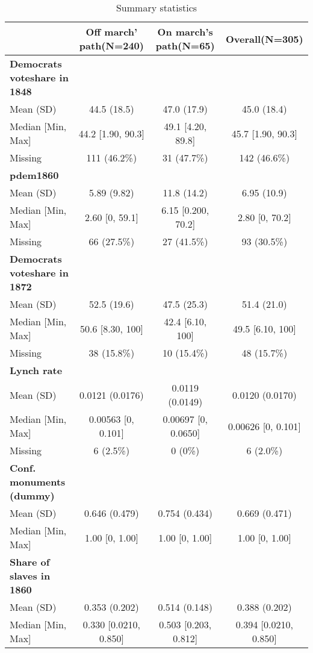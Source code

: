 \begin{table}[h]

\caption{\label{tab:desc_stat}Summary statistics}
\centering
\fontsize{8}{10}\selectfont
\begin{tabular}[t]{>{}lccc}
\toprule
 & Off march' path(N=240) & On march's path(N=65) & Overall(N=305)\\
\midrule
\textbf{Democrats voteshare in 1848} &  &  & \\
Mean (SD) & 44.5 (18.5) & 47.0 (17.9) & 45.0 (18.4)\\
Median [Min, Max] & 44.2 [1.90, 90.3] & 49.1 [4.20, 89.8] & 45.7 [1.90, 90.3]\\
Missing & 111 (46.2\%) & 31 (47.7\%) & 142 (46.6\%)\\
\addlinespace
\textbf{pdem1860} &  &  & \\
Mean (SD) & 5.89 (9.82) & 11.8 (14.2) & 6.95 (10.9)\\
Median [Min, Max] & 2.60 [0, 59.1] & 6.15 [0.200, 70.2] & 2.80 [0, 70.2]\\
Missing & 66 (27.5\%) & 27 (41.5\%) & 93 (30.5\%)\\
\addlinespace
\textbf{Democrats voteshare in 1872} &  &  & \\
Mean (SD) & 52.5 (19.6) & 47.5 (25.3) & 51.4 (21.0)\\
Median [Min, Max] & 50.6 [8.30, 100] & 42.4 [6.10, 100] & 49.5 [6.10, 100]\\
Missing & 38 (15.8\%) & 10 (15.4\%) & 48 (15.7\%)\\
\addlinespace
\textbf{Lynch rate} &  &  & \\
Mean (SD) & 0.0121 (0.0176) & 0.0119 (0.0149) & 0.0120 (0.0170)\\
Median [Min, Max] & 0.00563 [0, 0.101] & 0.00697 [0, 0.0650] & 0.00626 [0, 0.101]\\
Missing & 6 (2.5\%) & 0 (0\%) & 6 (2.0\%)\\
\addlinespace
\textbf{Conf. monuments (dummy)} &  &  & \\
Mean (SD) & 0.646 (0.479) & 0.754 (0.434) & 0.669 (0.471)\\
Median [Min, Max] & 1.00 [0, 1.00] & 1.00 [0, 1.00] & 1.00 [0, 1.00]\\
\addlinespace
\textbf{Share of slaves in 1860} &  &  & \\
Mean (SD) & 0.353 (0.202) & 0.514 (0.148) & 0.388 (0.202)\\
Median [Min, Max] & 0.330 [0.0210, 0.850] & 0.503 [0.203, 0.812] & 0.394 [0.0210, 0.850]\\

\end{tabular}
\end{table}
